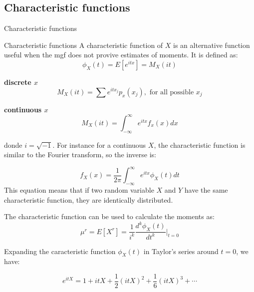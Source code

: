 \documentclass[8pt]{beamer}
\renewcommand{\emph}[1]{\textcolor{myorange}{#1}}
\begin{document}
\subsection{Characteristic functions} %
\begin{frame}{Characteristic functions}
    \begin{block}{Characteristic functions}
        A \alert{characteristic function} of $X$ is an alternative function useful when the \emph{mgf} does not provive estimates of moments. It is defined as:
        \[
            \phi_X (t) = E[e^{itx}] = M_X (it)
        \]
\begin{minipage}[t]{0.44\textwidth}
\centering
\textbf{discrete $x$}
\[
    M_X (it) = \sum e^{it x_j} p_x (x_j), \text{ for all possible $x_j$}
\]
\end{minipage}
\hfill
\begin{minipage}[t]{0.44\textwidth}
\centering
\textbf{continuous $x$}
\[
    M_X (it) = \int_{-\infty}^{\infty} e^{it x} f_x (x) dx
\]

\end{minipage}

donde $i = \sqrt{-1}$. For instance for a continuous $X$, the characteristic function is similar to the \emph{Fourier transform}, so the inverse is:

\[
    f_X (x) = \frac{1}{2 \pi} \int_{-\infty}^{\infty} e^{itx}   \phi_X (t) dt
\]
This equation means that if two random variable $X$ and $Y$ have the same characteristic function, they are identically distributed.

The \emph{characteristic function} can be used to calculate the moments as:
\[
    \mu^r = E [X^r] = \frac{1}{i^k} \frac{d^k \phi_X (t)}{dt^k} \Big|_{t=0}
\]

Expanding the caracteristic function $\phi_X (t)$ in \emph{Taylor's series} around $t=0$, we have:

\[
    e^{itX} = 1 + itX + \frac{1}{2} (itX)^2 + \frac{1}{6} (itX)^3 + \cdots  
\]
    \end{block}
\end{frame}
\end{document}
